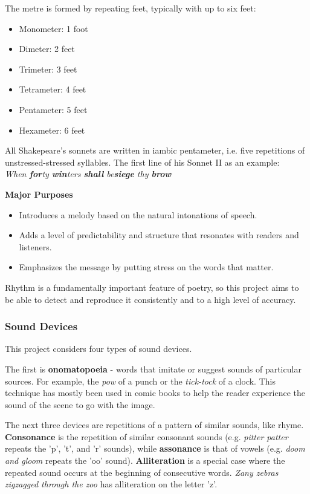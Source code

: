 The metre is formed by repeating feet, typically with up to six feet:
\begin{itemize}
\setlength{\itemsep}{0pt}
\item{Monometer: 1 foot}
\item{Dimeter: 2 feet}
\item{Trimeter: 3 feet}
\item{Tetrameter: 4 feet}
\item{Pentameter: 5 feet}
\item{Hexameter: 6 feet}
\end{itemize}

All Shakepeare's sonnets are written in iambic pentameter, i.e. five repetitions of unstressed-stressed syllables. The first line of his Sonnet II as an example:\\
\textit{When \textbf{for}ty \textbf{win}ters \textbf{shall} be\textbf{siege} thy \textbf{brow}}

\textbf{Major Purposes}
\begin{itemize}
\item{Introduces a melody based on the natural intonations of speech.} 
\item{Adds a level of predictability and structure that resonates with readers and listeners.}
\item{Emphasizes the message by putting stress on the words that matter.}
\end{itemize}

Rhythm is a fundamentally important feature of poetry, so this project aims to be able to detect and reproduce it consistently and to a high level of accuracy.

\subsubsection{Sound Devices}
This project considers four types of sound devices.

The first is \textbf{onomatopoeia} - words that imitate or suggest sounds of particular sources. For example, the \textit{pow} of a punch or the \textit{tick-tock} of a clock. This technique has mostly been used in comic books to help the reader experience the sound of the scene to go with the image.

The next three devices are repetitions of a pattern of similar sounds, like rhyme. \textbf{Consonance} is the repetition of similar consonant sounds (e.g. \textit{pitter patter} repeats the 'p', 't', and 'r' sounds), while \textbf{assonance} is that of vowels (e.g. \textit{doom and gloom} repeats the 'oo' sound). \textbf{Alliteration} is a special case where the repeated sound occurs at the beginning of consecutive words. \textit{Zany zebras zigzagged through the zoo} has alliteration on the letter 'z'.

